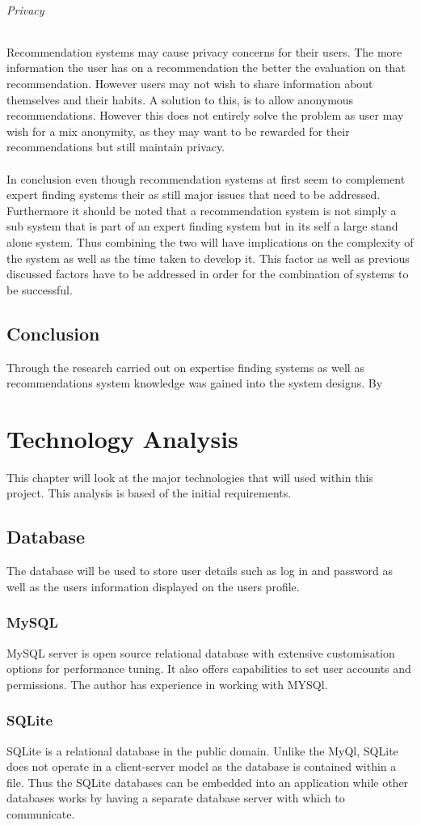 \documentclass[a4paper,oneside,11pt]{report}
\begin{document}
\subparagraph{Privacy}
Recommendation systems may cause privacy concerns for their users. The more information the user has on a recommendation the better the evaluation on that recommendation. However users may not wish to share information about themselves and their habits. A solution to this, is to allow anonymous recommendations. However this does not entirely solve the problem as user may wish for a mix anonymity, as they may want to be rewarded for their recommendations but still maintain privacy. 
\\
\\
In conclusion even though recommendation systems at first seem to complement expert finding systems their as still major issues that need to be addressed. Furthermore it should be noted that a recommendation system is not simply a sub system that is part of an expert finding system but in its self a large stand alone system. Thus combining the two will have implications on the complexity of the system as well as the time taken to develop it. This factor as well as previous discussed factors have to be addressed in order for the combination of systems to be successful.

\section{Conclusion}
Through the research carried out on expertise finding systems as well as recommendations system knowledge was gained into the system designs. By 
\chapter{Technology Analysis}
This chapter will look at the major technologies that will used within this project. This analysis is based of the initial requirements. 
\section{Database}
The database will be used to store user details such as log in and password as well as the users information displayed on the users profile.
\subsection{MySQL}
MySQL server is open source relational database with extensive customisation options for performance tuning. It also offers capabilities to set user accounts and permissions. The author has experience in working with MYSQl.
\subsection{SQLite}
SQLite is a relational database in the public domain. Unlike the MyQl, SQLite does not operate in a client-server model as the database is contained within a file. Thus the SQLite databases can be embedded into an application while other databases works by having a separate database server with which to communicate.
\end{document}
